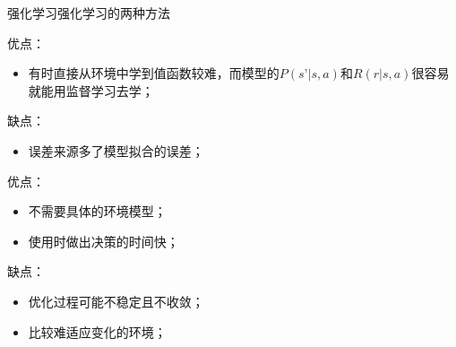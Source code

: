 \documentclass[10pt]{beamer}
\begin{document}
	\begin{frame}{强化学习}{强化学习的两种方法}
		\begin{small}		
			\begin{description}
				\item<2->[Model-Based RL] 
				
				优点：
				\begin{itemize}
					\item 有时直接从环境中学到值函数较难，而模型的$P(s’|s,a)$和$R(r|s,a)$很容易就能用监督学习去学；
				\end{itemize}
				
				缺点：
				\begin{itemize}
					\item 误差来源多了模型拟合的误差；
				\end{itemize}
				
				\item<3->[Model-Free RL] 优点：
				\begin{itemize}
					\item 不需要具体的环境模型；
					\item 使用时做出决策的时间快；
				\end{itemize}
				
				缺点：
				\begin{itemize}
					\item 优化过程可能不稳定且不收敛；
					\item 比较难适应变化的环境；
				\end{itemize}
			\end{description}
		\end{small}
	\end{frame}
\end{document}
